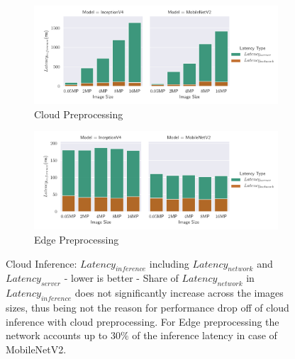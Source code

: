 \begin{figure}[!htb]
\centering
\begin{subfigure}[b]{0.95\textwidth}
   \includegraphics[width=1\linewidth]{./Bilder/single_plots/cloud_inference_plots/Cloud_Server_+_NetworkLatencies_cloudprepro.pdf}
   \caption{Cloud Preprocessing}
   \label{fig:CloudInferenceratioCloudtotal} 
\end{subfigure}

\begin{subfigure}[b]{0.95\textwidth}
   \includegraphics[width=1\linewidth]{./Bilder/single_plots/cloud_inference_plots/Cloud_Server_+_NetworkLatencies_edgeprepro.pdf}
   \caption{Edge Preprocessing}
   \label{fig:CloudInferenceRatioEdgetotal}
\end{subfigure}

\caption[Cloud Inference:  $Latency_{inference}$ including $Latency_{network}$ and $Latency_{server}$ - lower is better]{Cloud Inference:  $Latency_{inference}$ including $Latency_{network}$ and $Latency_{server}$ - lower is better - 
Share of $Latency_{network}$ in $Latency_{inference}$ does not significantly increase across the images sizes, thus being not the reason for performance drop off of cloud inference with cloud preprocessing. For Edge preprocessing the network accounts up to $30\%$ of the inference latency in case of MobileNetV2.}
\end{figure}


